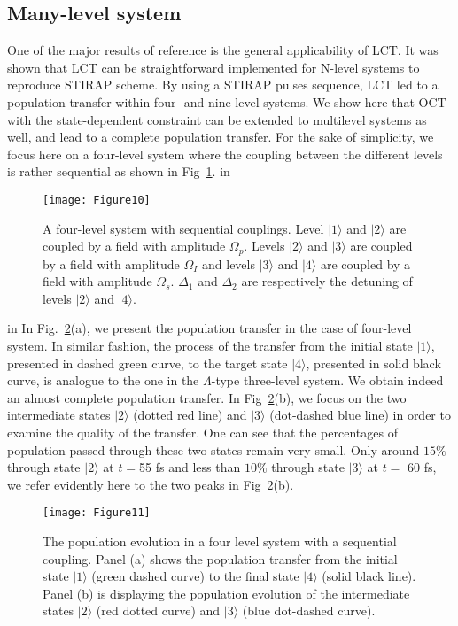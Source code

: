 \documentclass[]{interact}
\theoremstyle{plain}%
\theoremstyle{definition}
\theoremstyle{remark}
\begin{document}
\subsection{Many-level system }
One of the major results of reference \cite{Tannor} is the general 
applicability of LCT. It was shown that LCT can be straightforward implemented 
for N-level systems to reproduce STIRAP scheme. By using a STIRAP pulses 
sequence, LCT led to a population transfer within four- and nine-level systems.
We show here that OCT with the state-dependent constraint can be extended to 
multilevel systems as well, and lead to a complete population transfer. For the 
sake of simplicity, we focus here on a four-level system where the coupling 
between the different levels is rather sequential as shown in 
Fig~\ref{Fig:four_level}. 
 in
\begin{figure}
\centering
\texttt{[image: Figure10]}
\caption{A four-level system with sequential couplings. Level $|1\rangle$ and 
$|2\rangle$ are coupled by a field with amplitude $\Omega_p$. Levels 
$|2\rangle$ and $|3\rangle$ are coupled by a field with amplitude $\Omega_I$ 
and levels $|3\rangle$ and $|4\rangle$ are coupled by a field with amplitude 
$\Omega_s$. $\Delta_1$ and $\Delta_2$ are respectively the detuning of levels 
$|2\rangle$ and $|4\rangle$. 
\label{Fig:four_level}}
\end{figure}
 in
In Fig.~\ref{Fig:pop_four_octnew}(a), we present the population transfer in the 
case of four-level system. In similar fashion, the process of the transfer from 
the initial state $|1\rangle$, presented in dashed green curve, to the target 
state $|4\rangle$, presented in solid black curve, is analogue to the one in 
the $\Lambda$-type three-level system. 
We obtain indeed an almost complete population transfer. In 
Fig~\ref{Fig:pop_four_octnew}(b), we focus on the two intermediate states 
$|2\rangle$ (dotted red line) and $|3\rangle$ (dot-dashed blue line) in order 
to examine the quality of the transfer. One can see that the 
percentages of population passed through these two states remain very small. 
Only around $15\%$ through state $|2\rangle$ at $t=$55 fs and less 
than $10\%$ through state $|3\rangle$ at $t=$ 60 fs, we refer evidently here to 
the two peaks in Fig~\ref{Fig:pop_four_octnew}(b).
\begin{figure}[h!]
\centering
\texttt{[image: Figure11]}
\caption{The population evolution in a four level 
system with a sequential coupling. Panel (a) shows the population transfer from 
the initial state $|1\rangle$ (green dashed curve) to the final 
state $|4\rangle$ (solid black line). Panel (b) is displaying the population 
evolution of the intermediate states $|2\rangle$ (red dotted curve) 
and $|3\rangle$ (blue dot-dashed curve).
\label{Fig:pop_four_octnew}}
\end{figure}
\end{document}
